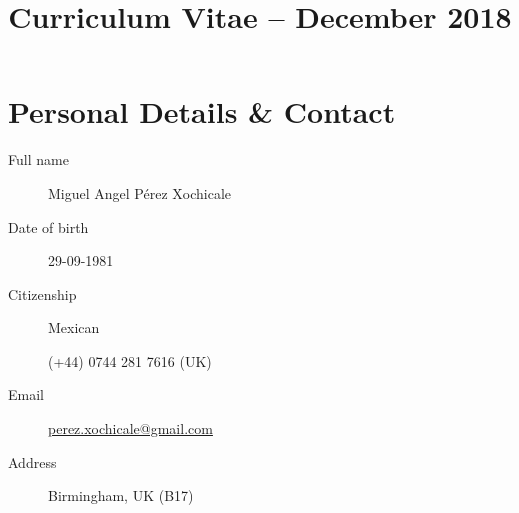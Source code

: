 \documentclass[10pt,a4paper,roman]{moderncv}
\title{Curriculum Vitae -- December 2018}
\begin{document}
%
%
\makecvtitle



%


\vspace{-15mm}


\section{Personal Details \& Contact}
%

\begin{changemargin}{2.4cm}{0.5cm}
  \begin{minipage}{.4\textwidth}
    \begin{description}
	\item[Full name] Miguel Angel P\'erez Xochicale
     	\item[Date of birth] 29-09-1981
	\item[Citizenship] Mexican

     \end{description}
  \end{minipage}
  \begin{minipage}{.4\textwidth}
  \begin{description}
     	\item[\faMobile ]  (+44) 0744 281 7616 (UK)
	\item[Email]  \href{perez.xochicale@ gmail.com}{perez.xochicale@gmail.com}
	\item[Address] Birmingham, UK (B17)
   \end{description}
  \end{minipage}
\end{changemargin}
\end{document}
